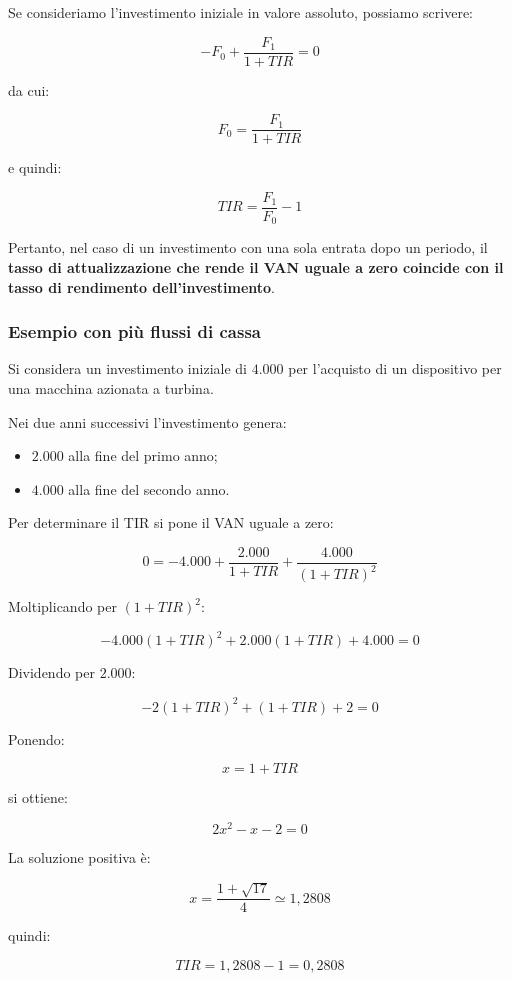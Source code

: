 \noindent Se consideriamo l'investimento iniziale in valore assoluto, possiamo scrivere:

\[
-F_0+\frac{F_1}{1+TIR}=0
\]

\noindent da cui:

\[
F_0=\frac{F_1}{1+TIR}
\]

\noindent e quindi:

\[
\boxed{
TIR=\frac{F_1}{F_0}-1
}
\]

\noindent Pertanto, nel caso di un investimento con una sola entrata dopo un periodo, il \textbf{tasso di attualizzazione che rende il VAN uguale a zero coincide con il tasso di rendimento dell'investimento}.

\subsubsection*{Esempio con più flussi di cassa}

\noindent Si considera un investimento iniziale di $4.000$ per l'acquisto di un dispositivo per una macchina azionata a turbina.

\medskip

\noindent Nei due anni successivi l'investimento genera:

\begin{itemize}
    \item $2.000$ alla fine del primo anno;
    \item $4.000$ alla fine del secondo anno.
\end{itemize}

\noindent Per determinare il TIR si pone il VAN uguale a zero:

\[
0
=
-4.000
+
\frac{2.000}{1+TIR}
+
\frac{4.000}{(1+TIR)^2}
\]

\noindent Moltiplicando per $(1+TIR)^2$:

\[
-4.000(1+TIR)^2
+
2.000(1+TIR)
+
4.000
=
0
\]

\noindent Dividendo per $2.000$:

\[
-2(1+TIR)^2+(1+TIR)+2=0
\]

\noindent Ponendo:

\[
x=1+TIR
\]

\noindent si ottiene:

\[
2x^2-x-2=0
\]

\noindent La soluzione positiva è:

\[
x=\frac{1+\sqrt{17}}{4}\simeq1,2808
\]

\noindent quindi:

\[
TIR=1,2808-1=0,2808
\]

